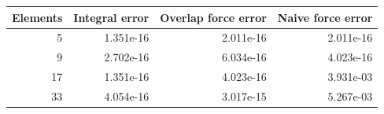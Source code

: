 \begin{center}\small
\begin{tabular}{rrrr}\toprule
Elements & Integral error & Overlap force error & Naive force error\\\midrule
5 & 1.351e-16 & 2.011e-16 & 2.011e-16\\
9 & 2.702e-16 & 6.034e-16 & 4.023e-16\\
17 & 1.351e-16 & 4.023e-16 & 3.931e-03\\
33 & 4.054e-16 & 3.017e-15 & 5.267e-03\\
\bottomrule\end{tabular}
\end{center}
